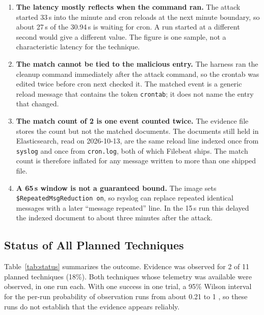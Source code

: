 \documentclass[11pt,a4paper]{article}
\begin{document}
\begin{enumerate}
    \item \textbf{The latency mostly reflects when the command ran.} The
    attack started 33\,s into the minute and cron reloads at the next minute
    boundary, so about 27\,s of the 30.94\,s is waiting for cron. A run
    started at a different second would give a different value. The figure is
    one sample, not a characteristic latency for the technique.
    \item \textbf{The match cannot be tied to the malicious entry.} The
    harness ran the cleanup command immediately after the attack command, so
    the crontab was edited twice before cron next checked it. The matched
    event is a generic reload message that contains the token
    \texttt{crontab}; it does not name the entry that changed.
    \item \textbf{The match count of 2 is one event counted twice.} The
    evidence file stores the count but not the matched documents. The
    documents still held in Elasticsearch, read on 2026-10-13, are the same
    reload line indexed once from \texttt{syslog} and once from
    \texttt{cron.log}, both of which Filebeat ships. The match count is
    therefore inflated for any message written to more than one shipped
    file.
    \item \textbf{A 65\,s window is not a guaranteed bound.} The image sets
    \texttt{\$RepeatedMsgReduction on}, so rsyslog can replace repeated
    identical messages with a later ``message repeated'' line. In the 15\,s
    run this delayed the indexed document to about three minutes after the
    attack.
\end{enumerate}

\subsection{Status of All Planned Techniques}

Table~\ref{tab:status} summarizes the outcome. Evidence was observed for 2 of
11 planned techniques (18\%). Both techniques whose telemetry was available
were observed, in one run each. With one success in one trial, a 95\% Wilson
interval for the per-run probability of observation runs from about 0.21 to 1
\cite{brown2001}, so these runs do not establish that the evidence appears
reliably.
\end{document}
